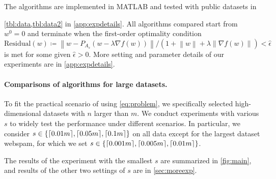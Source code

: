 \documentclass{article}
\newcommand{\Alert}[1]{{ #1}}
\theoremstyle{plain}
\theoremstyle{definition}
\theoremstyle{remark}
\newcommand*{\lmss}{\fontfamily{lmss}\selectfont}
\newcommand{\epsin}{\epsilon_{\text{inner}}}
\DeclareMathOperator*{\dist}{dist}
\DeclarePairedDelimiter{\ceil}{\lceil}{\rceil}
\newcommand{\norm}[1]{{\left\|{#1}\right\|}}
\def\webspam{{\lmss webspam}\xspace}
\def\rcv{{\lmss rcv1.binary}\xspace}
\def\gisette{{\lmss gisette\_scale}\xspace}
\def\duke{{\lmss duke}\xspace}
\def\leu{{\lmss leukemia}\xspace}
\begin{document}
The algorithms are implemented in MATLAB and tested 
with public datasets in \Alert{\cref{tbl:data,tbl:data2} in 
\cref{app:expdetails}. All algorithms compared start from $w^0=0$ and 
terminate when
the first-order optimality condition 
\begin{equation}
\text{Residual}(w) \coloneqq \norm{w - P_{A_s}\left( w - \lambda \nabla f\left( 
w
	\right) \right)}/ (1+\norm{w} + \lambda \norm{\nabla f \left( w
	\right)}) < \hat \epsilon
\label{eq:opt}
\end{equation}
is met for some given $\hat \epsilon > 0$. 	More setting and parameter 
details of our experiments are in \cref{app:expdetails}.

\paragraph{Comparisons of algorithms for large datasets.} To fit the practical 
scenario of using \cref{eq:problem}, we specifically selected
	high-dimensional datasets with $n$ larger than $m$.
	We conduct experiments with various $s$ to widely test
	the performance under different scenarios.
	In particular, we consider $s \in \{ \ceil{0.01m}, \ceil{0.05m},
	\ceil{0.1m}\}$ on all data except for the 
	largest dataset \webspam, for which we set $s \in \{ \ceil{0.001m}, 
	\ceil{0.005m}, \ceil{0.01m}\}$.	}
	The results of the experiment with the smallest $s$ are summarized in
\cref{fig:main}, and results of the other two settings of $s$ are in
\cref{sec:moreexp}.


\end{document}
